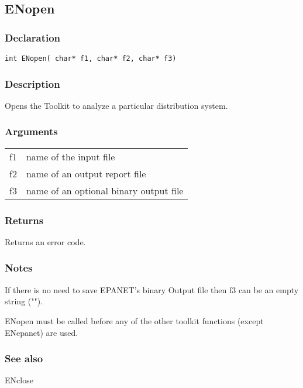 \subsection{ENopen}
\subsubsection{Declaration}
\begin{lstlisting}
int ENopen( char* f1, char* f2, char* f3)
\end{lstlisting}

\subsubsection{Description}
Opens the Toolkit to analyze a particular distribution system.
\subsubsection{Arguments}
\begin{tabular}{ r p{11cm} }
f1&name of the input file \\[6pt]
f2& name of an output report file \\[6pt]
f3& name of an optional binary output file\\[6pt]
\end{tabular}

 
 
  
\subsubsection{Returns}
Returns an error code.
 


\subsubsection{Notes}
If there is no need to save EPANET's binary Output file then f3 can be an empty string ("").

ENopen must be called before any of the other toolkit functions (except ENepanet) are used.
 
\subsubsection{See also}
ENclose 
